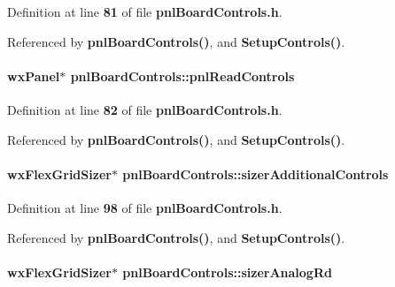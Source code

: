Definition at line {\bf 81} of file {\bf pnl\+Board\+Controls.\+h}.



Referenced by {\bf pnl\+Board\+Controls()}, and {\bf Setup\+Controls()}.

\paragraph[{pnl\+Read\+Controls}]{\setlength{\rightskip}{0pt plus 5cm}wx\+Panel$\ast$ pnl\+Board\+Controls\+::pnl\+Read\+Controls\hspace{0.3cm}{\ttfamily [protected]}}\label{classpnlBoardControls_a5cbded08f0a32e1e24f25e94bb09f13c}


Definition at line {\bf 82} of file {\bf pnl\+Board\+Controls.\+h}.



Referenced by {\bf pnl\+Board\+Controls()}, and {\bf Setup\+Controls()}.

\paragraph[{sizer\+Additional\+Controls}]{\setlength{\rightskip}{0pt plus 5cm}wx\+Flex\+Grid\+Sizer$\ast$ pnl\+Board\+Controls\+::sizer\+Additional\+Controls\hspace{0.3cm}{\ttfamily [protected]}}\label{classpnlBoardControls_a0e32225fc511168023dfa6856e69e862}


Definition at line {\bf 98} of file {\bf pnl\+Board\+Controls.\+h}.



Referenced by {\bf pnl\+Board\+Controls()}, and {\bf Setup\+Controls()}.

\paragraph[{sizer\+Analog\+Rd}]{\setlength{\rightskip}{0pt plus 5cm}wx\+Flex\+Grid\+Sizer$\ast$ pnl\+Board\+Controls\+::sizer\+Analog\+Rd\hspace{0.3cm}{\ttfamily [protected]}}\label{classpnlBoardControls_a15389ede8a66e5da357dcc07e89f209f}


